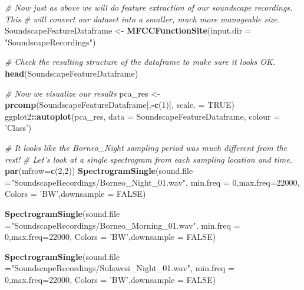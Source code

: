 \documentclass[]{book}
\newenvironment{Shaded}{\begin{snugshade}}{\end{snugshade}}
\newcommand{\CommentTok}[1]{\textcolor[rgb]{0.56,0.35,0.01}{\textit{#1}}}
\newcommand{\DataTypeTok}[1]{\textcolor[rgb]{0.13,0.29,0.53}{#1}}
\newcommand{\DecValTok}[1]{\textcolor[rgb]{0.00,0.00,0.81}{#1}}
\newcommand{\KeywordTok}[1]{\textcolor[rgb]{0.13,0.29,0.53}{\textbf{#1}}}
\newcommand{\NormalTok}[1]{#1}
\newcommand{\OperatorTok}[1]{\textcolor[rgb]{0.81,0.36,0.00}{\textbf{#1}}}
\newcommand{\OtherTok}[1]{\textcolor[rgb]{0.56,0.35,0.01}{#1}}
\newcommand{\StringTok}[1]{\textcolor[rgb]{0.31,0.60,0.02}{#1}}
\begin{document}
\begin{Shaded}
\begin{Highlighting}[]
\CommentTok{# Now just as above we will do feature extraction of our soundscape recordings. This}
\CommentTok{# will convert our dataset into a smaller, much more manageable size. }
\NormalTok{SoundscapeFeatureDataframe <-}\StringTok{ }
\StringTok{  }\KeywordTok{MFCCFunctionSite}\NormalTok{(}\DataTypeTok{input.dir =} \StringTok{"SoundscapeRecordings"}\NormalTok{)}

\CommentTok{# Check the resulting structure of the dataframe to make sure it looks OK.}
\KeywordTok{head}\NormalTok{(SoundscapeFeatureDataframe)}

\CommentTok{# Now we visualize our results}
\NormalTok{pca_res <-}\StringTok{ }\KeywordTok{prcomp}\NormalTok{(SoundscapeFeatureDataframe[,}\OperatorTok{-}\KeywordTok{c}\NormalTok{(}\DecValTok{1}\NormalTok{)], }\DataTypeTok{scale. =} \OtherTok{TRUE}\NormalTok{)}
\NormalTok{ggplot2}\OperatorTok{::}\KeywordTok{autoplot}\NormalTok{(pca_res, }\DataTypeTok{data =}\NormalTok{ SoundscapeFeatureDataframe, }
         \DataTypeTok{colour =} \StringTok{'Class'}\NormalTok{)}

\CommentTok{# It looks like the Borneo_Night sampling period was much different from the rest!}
\CommentTok{# Let's look at a single spectrogram from each sampling location and time.}
\KeywordTok{par}\NormalTok{(}\DataTypeTok{mfrow=}\KeywordTok{c}\NormalTok{(}\DecValTok{2}\NormalTok{,}\DecValTok{2}\NormalTok{))}
\KeywordTok{SpectrogramSingle}\NormalTok{(}\DataTypeTok{sound.file =}\StringTok{"SoundscapeRecordings/Borneo_Night_01.wav"}\NormalTok{,}
                  \DataTypeTok{min.freq =} \DecValTok{0}\NormalTok{,}\DataTypeTok{max.freq=}\DecValTok{22000}\NormalTok{,}
                  \DataTypeTok{Colors =} \StringTok{'BW'}\NormalTok{,}\DataTypeTok{downsample =} \OtherTok{FALSE}\NormalTok{)}

\KeywordTok{SpectrogramSingle}\NormalTok{(}\DataTypeTok{sound.file =}\StringTok{"SoundscapeRecordings/Borneo_Morning_01.wav"}\NormalTok{,}
                  \DataTypeTok{min.freq =} \DecValTok{0}\NormalTok{,}\DataTypeTok{max.freq=}\DecValTok{22000}\NormalTok{,}
                  \DataTypeTok{Colors =} \StringTok{'BW'}\NormalTok{,}\DataTypeTok{downsample =} \OtherTok{FALSE}\NormalTok{)}

\KeywordTok{SpectrogramSingle}\NormalTok{(}\DataTypeTok{sound.file =}\StringTok{"SoundscapeRecordings/Sulawesi_Night_01.wav"}\NormalTok{,}
                  \DataTypeTok{min.freq =} \DecValTok{0}\NormalTok{,}\DataTypeTok{max.freq=}\DecValTok{22000}\NormalTok{,}
                  \DataTypeTok{Colors =} \StringTok{'BW'}\NormalTok{,}\DataTypeTok{downsample =} \OtherTok{FALSE}\NormalTok{)}


\end{Highlighting}
\end{Shaded}
\end{document}
